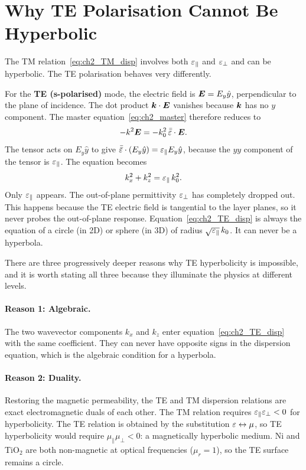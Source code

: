 \section{Why TE Polarisation Cannot Be Hyperbolic}
\label{sec:ch2_TE}

The TM relation~\eqref{eq:ch2_TM_disp} involves both $\varepsilon_{\parallel}$ and $\varepsilon_{\perp}$
and can be hyperbolic. The TE polarisation behaves very differently.

For the \textbf{TE (s-polarised)} mode, the electric field is $\bm{E} = E_y\hat{y}$,
perpendicular to the plane of incidence. The dot product $\bm{k}\cdot\bm{E}$
vanishes because $\bm{k}$ has no $y$ component. The master
equation~\eqref{eq:ch2_master} therefore reduces to
\begin{equation}
  -k^2\bm{E} = -k_0^2\,\bar{\bar{\varepsilon}}\cdot\bm{E}.
  \label{eq:ch2_TE_wave}
\end{equation}
The tensor acts on $E_y\hat{y}$ to give $\bar{\bar{\varepsilon}}\cdot(E_y\hat{y}) =
\varepsilon_{\parallel} E_y\hat{y}$, because the $yy$ component of the tensor is $\varepsilon_{\parallel}$.
The equation becomes
\begin{equation}
  k_x^2 + k_z^2 = \varepsilon_{\parallel}\,k_0^2.
  \label{eq:ch2_TE_disp}
\end{equation}
Only $\varepsilon_{\parallel}$ appears. The out-of-plane permittivity $\varepsilon_{\perp}$ has completely
dropped out. This happens because the TE electric field is tangential to the
layer planes, so it never probes the out-of-plane response.
Equation~\eqref{eq:ch2_TE_disp} is always the equation of a circle (in 2D)
or sphere (in 3D) of radius $\sqrt{\varepsilon_{\parallel}}\,k_0$. It can never be a hyperbola.

There are three progressively deeper reasons why TE hyperbolicity is
impossible, and it is worth stating all three because they illuminate the
physics at different levels.

\paragraph{Reason 1: Algebraic.} The two wavevector components $k_x$ and
$k_z$ enter equation~\eqref{eq:ch2_TE_disp} with the same coefficient. They
can never have opposite signs in the dispersion equation, which is the
algebraic condition for a hyperbola.

\paragraph{Reason 2: Duality.} Restoring the magnetic permeability, the TE
and TM dispersion relations are exact electromagnetic duals of each other.
The TM relation requires $\varepsilon_{\parallel}\varepsilon_{\perp} < 0$ for hyperbolicity. The TE relation
is obtained by the substitution $\varepsilon \leftrightarrow \mu$, so TE
hyperbolicity would require $\mu_\parallel\mu_\perp < 0$: a magnetically
hyperbolic medium. Ni and TiO$_2$ are both non-magnetic at optical frequencies
($\mu_r = 1$), so the TE surface remains a circle.

